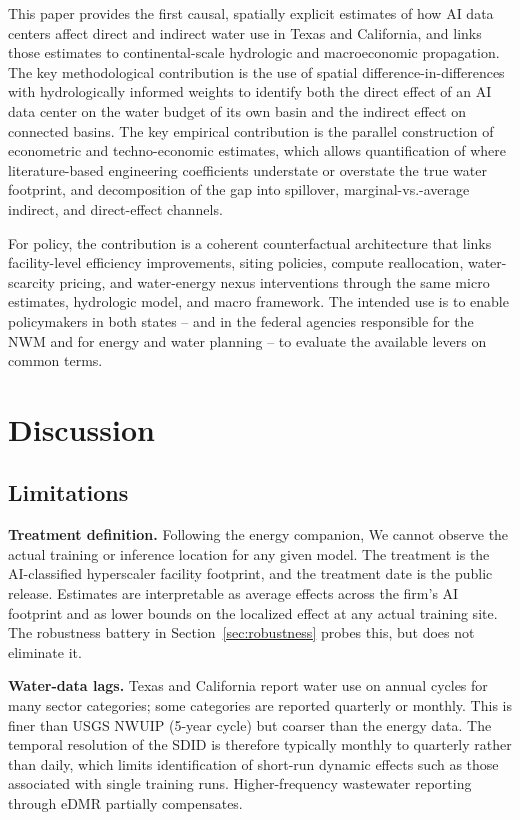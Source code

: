 \documentclass[11pt, letterpaper]{article}
\begin{document}
This paper provides the first causal, spatially explicit estimates of how AI data centers affect direct and indirect water use in Texas and California, and links those estimates to continental-scale hydrologic and macroeconomic propagation. The key methodological contribution is the use of spatial difference-in-differences with hydrologically informed weights to identify both the direct effect of an AI data center on the water budget of its own basin and the indirect effect on connected basins. The key empirical contribution is the parallel construction of econometric and techno-economic estimates, which allows quantification of where literature-based engineering coefficients understate or overstate the true water footprint, and decomposition of the gap into spillover, marginal-vs.-average indirect, and direct-effect channels.

For policy, the contribution is a coherent counterfactual architecture that links facility-level efficiency improvements, siting policies, compute reallocation, water-scarcity pricing, and water-energy nexus interventions through the same micro estimates, hydrologic model, and macro framework. The intended use is to enable policymakers in both states -- and in the federal agencies responsible for the NWM and for energy and water planning -- to evaluate the available levers on common terms.

\section{Discussion}
\label{sec:discussion}

\subsection{Limitations}
\label{sec:limitations}

\textbf{Treatment definition.} Following the energy companion, We cannot observe the actual training or inference location for any given model. The treatment is the AI-classified hyperscaler facility footprint, and the treatment date is the public release. Estimates are interpretable as average effects across the firm's AI footprint and as lower bounds on the localized effect at any actual training site. The robustness battery in Section~\ref{sec:robustness} probes this, but does not eliminate it.

\textbf{Water-data lags.} Texas and California report water use on annual cycles for many sector categories; some categories are reported quarterly or monthly. This is finer than USGS NWUIP (5-year cycle) but coarser than the energy data. The temporal resolution of the SDID is therefore typically monthly to quarterly rather than daily, which limits identification of short-run dynamic effects such as those associated with single training runs. Higher-frequency wastewater reporting through eDMR partially compensates.
\end{document}
